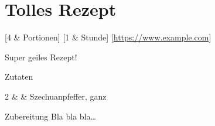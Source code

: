 \section{Tolles Rezept}\label{rcp:tolles-rezept}


\begin{recipeintro}
  [4 & Portionen]
  [1 & Stunde]
  [\url{https://www.example.com}]

  Super geiles Rezept!
\end{recipeintro}

\begin{ingredients}
  {Zutaten}

  2                &  \si{\tl}           &  Szechuanpfeffer, ganz  \\


\end{ingredients}

\vspace{0.5cm}

\begin{recipestep}
  {Zubereitung}
  Bla bla bla\ldots
\end{recipestep}
